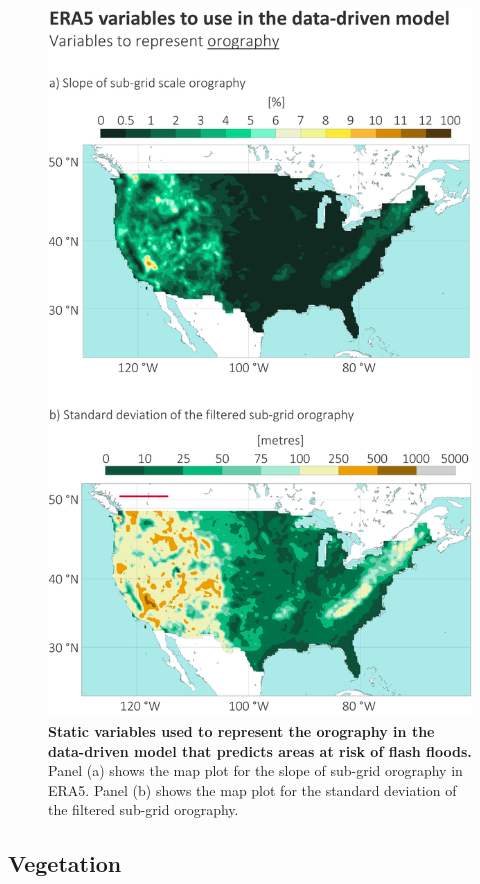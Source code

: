 \begin{figure}[htbp]
\centering
\includegraphics[width=\textwidth]{orography.png}
\caption{\textbf{Static variables used to represent the orography in the data-driven model that predicts areas at risk of flash floods.} Panel (a) shows the map plot for the slope of sub-grid orography in ERA5. Panel (b) shows the map plot for the standard deviation of the filtered sub-grid orography.}
\label{fig:orography}
\end{figure}


\subsection{Vegetation}

